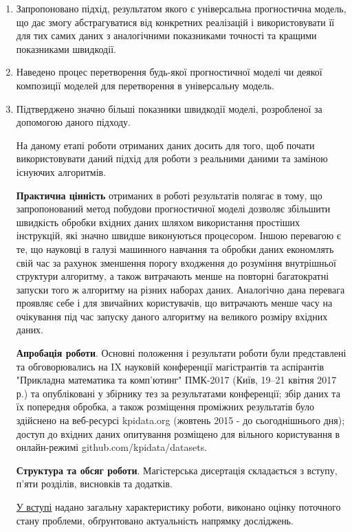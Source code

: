 \documentclass[14pt]{article}
\begin{document}
\begin{enumerate}
	\item Запропоновано підхід, результатом якого є універсальна прогностична модель, що дає змогу абстрагуватися від конкретних реалізацій і використовувати її для тих самих даних з аналогічними показниками точності та кращими показниками швидкодії.
	\item Наведено процес перетворення будь-якої прогностичної моделі чи деякої композиції моделей для перетворення в універсальну модель.
	\item Підтверджено значно більші показники швидкодії моделі, розробленої за допомогою даного підходу.
\begin{enumerate}
На даному етапі роботи отриманих даних досить для того, щоб почати використовувати даний підхід для роботи з реальними даними та заміною існуючих алгоритмів.

\textbf{Практична цінність} отриманих в роботі результатів полягає в тому,
що запропонований метод побудови прогностичної моделі дозволяє збільшити швидкість обробки вхідних даних шляхом використання простіших інструкцій, які значно швидше виконуються процесором. Іншою перевагою є те, що науковці в галузі машинного навчання та обробки даних економлять свій час за рахунок зменшення порогу входження до розуміння внутрішньої структури алгоритму, а також витрачають менше на повторні багатократні запуски того ж алгоритму на різних наборах даних. Аналогічно дана перевага проявляє себе і для звичайних користувачів, що витрачають менше часу на очікування під час запуску даного алгоритму на великого розміру вхідних даних.

\textbf{Апробація роботи}. Основні положення і результати роботи були представлені та обговорювались на IX науковій конференції магістрантів та аспірантів "Прикладна математика та комп’ютинг" ПМК-2017 (Київ,
19–21 квітня 2017 р.) та опубліковані у збірнику тез за результатами конференції; збір даних та їх попередня обробка, а також розміщення проміжних результатів було здійснено на веб-ресурсі kpidata.org (жовтень 2015 - до сьогоднішнього дня); доступ до вхідних даних опитування розміщено для вільного користування в онлайн-режимі github.com/kpidata/datasets.

\textbf{Структура та обсяг роботи}. Магістерська дисертація складається з вступу, п'яти розділів, висновків та додатків.

\underline{У вступі} надано загальну характеристику роботи, виконано оцінку поточного стану проблеми, обґрунтовано актуальність напрямку досліджень.


\end{enumerate}
\end{enumerate}
\end{document}
